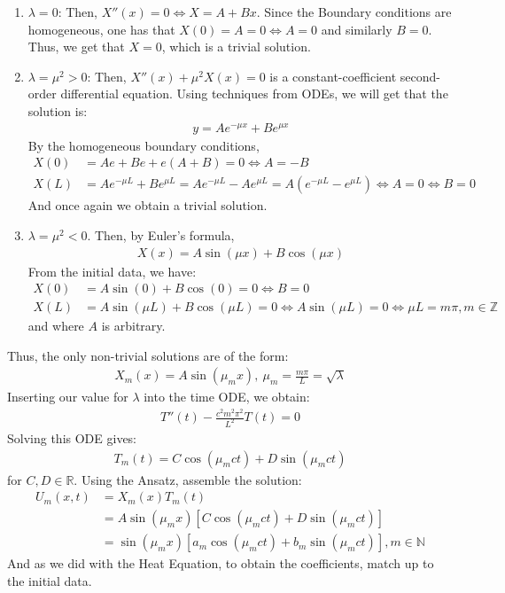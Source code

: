 \documentclass[11pt]{scrartcl}
\theoremstyle{definition}
\theoremstyle{remark}
\newcommand{\R}[0]{\mathbb{R}}
\begin{document}
\begin{enumerate}[noitemsep]
	\item $\lambda = 0$: Then, $X''(x) = 0 \iff X = A + Bx$. Since the Boundary conditions are homogeneous, one has that $X(0) = A = 0 \iff A =0$ and similarly $B = 0$. Thus, we get that $X=0$, which is a trivial solution.
	\item $\lambda = \mu^2 > 0$: Then, $X''(x) + \mu^2X(x) = 0$ is a constant-coefficient second-order differential equation. Using techniques from ODEs, we will get that the solution is: 
	\begin{align}
		y = A e^{- \mu x} + B e^{\mu x} 
	\end{align}
	By the homogeneous boundary conditions, 
	\begin{align*}
		X(0) & = Ae + Be + e(A+B) = 0 \iff A = -B \\
		X(L) & = Ae^{-\mu L} + Be^{\mu L} = Ae^{-\mu L} - Ae^{\mu L} = A(e^{-\mu L} - e^{\mu L}) \iff A = 0 \iff B=0
	\end{align*}
	And once again we obtain a trivial solution. 
	\item $\lambda = \mu^2 < 0$. Then, by Euler's formula, 
	\begin{align}
		X(x) = A \sin (\mu x) + B \cos (\mu x) 	
	\end{align}
	From the initial data, we have:
	\begin{align*}
		X(0) & = A \sin (0) + B \cos(0) = 0 \iff B = 0 \\
		X(L) & = A \sin (\mu L) + B \cos (\mu L) = 0 \iff A \sin (\mu L) = 0 \iff \mu L = m \pi, m \in \mathbb{Z}
	\end{align*}
	and where $A$ is arbitrary. 
\end{enumerate}
Thus, the only non-trivial solutions are of the form: 
\begin{align*}
	X_m(x) = A \sin (\mu_m x),\ \mu_m = \frac{m \pi}{L} = \sqrt{\lambda}
\end{align*}
Inserting our value for $\lambda$ into the time ODE, we obtain: 
\begin{align*}
	T''(t) - \frac{c^2 m^2 \pi^2}{L^2} T(t) = 0 
\end{align*}
Solving this ODE gives: 
\begin{align}
	T_m(t) = C \cos (\mu_m ct) + D \sin (\mu_m ct) 	
\end{align}
for $C, D \in \R$. Using the Ansatz, assemble the solution:
\begin{align*} 
U_m (x,t)  & = X_m(x) T_m(t) \\
		   & = A \sin (\mu_m x) [ C \cos (\mu_m ct) + D \sin (\mu_m ct) ] \\
		   & = \sin (\mu_m x) [ a_m \cos (\mu_m ct) + b_m \sin (\mu_m ct) ], m \in \mathbb{N}
\end{align*} 
And as we did with the Heat Equation, to obtain the coefficients, match up to the initial data.
\end{document}
